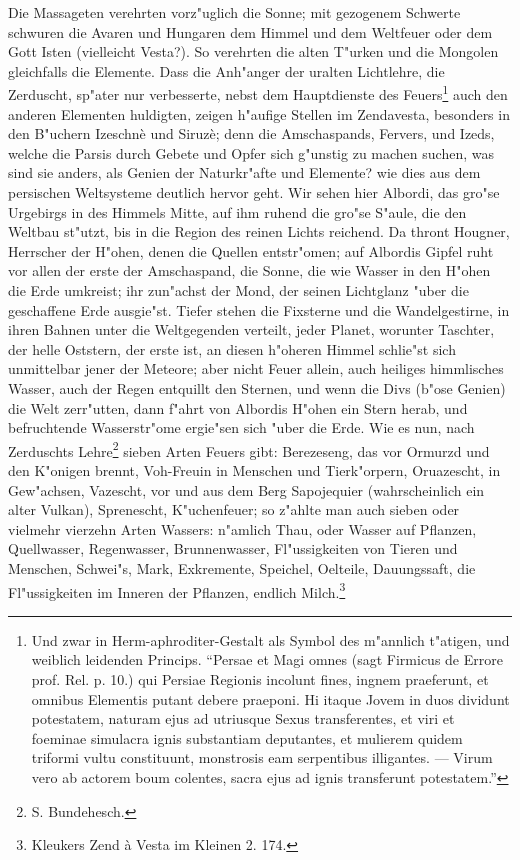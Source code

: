 \documentclass[a4paper, 11pt, oneside, polutonikogreek, german]{article}
\begin{document}
Die Massageten verehrten vorz"uglich die Sonne; mit gezogenem Schwerte schwuren die Avaren und Hungaren dem Himmel und dem Weltfeuer oder dem Gott Isten (vielleicht Vesta?). So verehrten die alten T"urken und die Mongolen gleichfalls die Elemente. Dass die Anh"anger der uralten Lichtlehre, die Zerduscht, sp"ater nur verbesserte, nebst dem Hauptdienste des Feuers\footnote{Und zwar in Herm-aphroditer-Gestalt als Symbol des m"annlich t"atigen, und weiblich leidenden Princips. "`Persae et Magi omnes (sagt Firmicus de Errore prof. Rel. p. 10.) qui Persiae Regionis incolunt fines, ingnem praeferunt, et omnibus Elementis putant debere praeponi. Hi itaque Jovem in duos dividunt potestatem, naturam ejus ad utriusque Sexus transferentes, et viri et foeminae simulacra ignis substantiam deputantes, et mulierem quidem triformi vultu constituunt, monstrosis eam serpentibus illigantes. --- Virum vero ab actorem boum colentes, sacra ejus ad ignis transferunt potestatem."'} auch den anderen Elementen huldigten, zeigen h"aufige Stellen im Zendavesta, besonders in den B"uchern Izeschnè und Siruzè; denn die Amschaspands, Fervers, und Izeds, welche die Parsis durch Gebete und Opfer sich g"unstig zu machen suchen, was sind sie anders, als Genien der Naturkr"afte und Elemente? wie dies aus dem persischen Weltsysteme deutlich hervor geht. Wir sehen hier Albordi, das gro"se Urgebirgs in des Himmels Mitte, auf ihm ruhend die gro"se S"aule, die den Weltbau st"utzt, bis in die Region des reinen Lichts reichend. Da thront Hougner, Herrscher der H"ohen, denen die Quellen entstr"omen; auf Albordis Gipfel ruht vor allen der erste der Amschaspand, die Sonne, die wie Wasser in den H"ohen die Erde umkreist; ihr zun"achst der Mond, der seinen Lichtglanz "uber die geschaffene Erde ausgie"st. Tiefer stehen die Fixsterne und die Wandelgestirne, in ihren Bahnen unter die Weltgegenden verteilt, jeder Planet, worunter Taschter, der helle Oststern, der erste ist, an diesen h"oheren Himmel schlie"st sich unmittelbar jener der Meteore; aber nicht Feuer allein, auch heiliges himmlisches Wasser, auch der Regen entquillt den Sternen, und wenn die Divs (b"ose Genien) die Welt zerr"utten, dann f"ahrt von Albordis H"ohen ein Stern herab, und befruchtende Wasserstr"ome ergie"sen sich "uber die Erde. Wie es nun, nach Zerduschts Lehre\footnote{S. Bundehesch.} sieben Arten Feuers gibt: Berezeseng, das vor Ormurzd und den K"onigen brennt, Voh-Freuin in Menschen und Tierk"orpern, Oruazescht, in Gew"achsen, Vazescht, vor und aus dem Berg Sapojequier (wahrscheinlich ein alter Vulkan), Sprenescht, K"uchenfeuer; so z"ahlte man auch sieben oder vielmehr vierzehn Arten Wassers: n"amlich Thau, oder Wasser auf Pflanzen, Quellwasser, Regenwasser, Brunnenwasser, Fl"ussigkeiten von Tieren und Menschen, Schwei"s, Mark, Exkremente, Speichel, Oelteile, Dauungssaft, die Fl"ussigkeiten im Inneren der Pflanzen, endlich Milch.\footnote{Kleukers Zend à Vesta im Kleinen 2. 174.}
\end{document}

